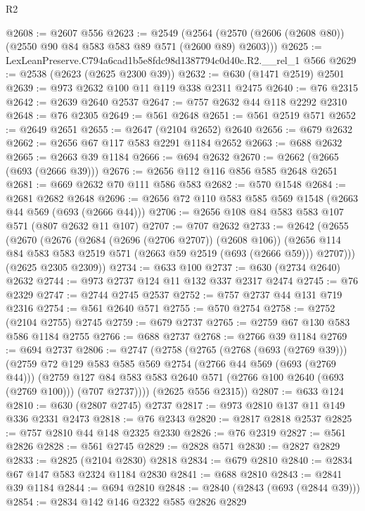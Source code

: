 \begin{lexlean}{R2}
\begin{coremodule}
@2608 := @2607 @556
@2623 := @2549
    (@2564 (@2570 (@2606 (@2608 @80)) (@2550 @90 @84 @583 @583 @89 @571 (@2600 @89) @2603)))
@2625 := LexLeanPreserve.C794a6cad1b5e8fdc98d1387794c0d40c.R2.__rel_1 @566
@2629 := @2538 (@2623 (@2625 @2300 @39))
@2632 := @630 (@1471 @2519) @2501
@2639 := @973 @2632 @100 @11 @119 @338 @2311 @2475
@2640 := @76 @2315
@2642 := @2639 @2640 @2537
@2647 := @757 @2632 @44 @118 @2292 @2310
@2648 := @76 @2305
@2649 := @561 @2648
@2651 := @561 @2519 @571
@2652 := @2649 @2651
@2655 := @2647 (@2104 @2652) @2640
@2656 := @679 @2632
@2662 := @2656 @67 @117 @583 @2291 @1184 @2652
@2663 := @688 @2632
@2665 := @2663 @39 @1184
@2666 := @694 @2632
@2670 := @2662 (@2665 (@693 (@2666 @39)))
@2676 := @2656 @112 @116 @856 @585 @2648 @2651
@2681 := @669 @2632 @70 @111 @586 @583
@2682 := @570 @1548
@2684 := @2681 @2682 @2648
@2696 := @2656 @72 @110 @583 @585 @569 @1548 (@2663 @44 @569 (@693 (@2666 @44)))
@2706 := @2656 @108 @84 @583 @583 @107 @571 (@807 @2632 @11 @107)
@2707 := @707 @2632
@2733 := @2642
    (@2655
      (@2670
        (@2676
          (@2684 (@2696 (@2706 @2707)) (@2608 @106))
          (@2656 @114 @84 @583 @583 @2519 @571 (@2663 @59 @2519 (@693 (@2666 @59))) @2707)))
      (@2625 @2305 @2309))
@2734 := @633 @100
@2737 := @630 (@2734 @2640) @2632
@2744 := @973 @2737 @124 @11 @132 @337 @2317 @2474
@2745 := @76 @2329
@2747 := @2744 @2745 @2537
@2752 := @757 @2737 @44 @131 @719 @2316
@2754 := @561 @2640 @571
@2755 := @570 @2754
@2758 := @2752 (@2104 @2755) @2745
@2759 := @679 @2737
@2765 := @2759 @67 @130 @583 @586 @1184 @2755
@2766 := @688 @2737
@2768 := @2766 @39 @1184
@2769 := @694 @2737
@2806 := @2747
    (@2758
      (@2765
        (@2768 (@693 (@2769 @39)))
        (@2759
          @72
          @129
          @583
          @585
          @569
          @2754
          (@2766 @44 @569 (@693 (@2769 @44)))
          (@2759
            @127
            @84
            @583
            @583
            @2640
            @571
            (@2766 @100 @2640 (@693 (@2769 @100)))
            (@707 @2737))))
      (@2625 @556 @2315))
@2807 := @633 @124
@2810 := @630 (@2807 @2745) @2737
@2817 := @973 @2810 @137 @11 @149 @336 @2331 @2473
@2818 := @76 @2343
@2820 := @2817 @2818 @2537
@2825 := @757 @2810 @44 @148 @2325 @2330
@2826 := @76 @2319
@2827 := @561 @2826
@2828 := @561 @2745
@2829 := @2828 @571
@2830 := @2827 @2829
@2833 := @2825 (@2104 @2830) @2818
@2834 := @679 @2810
@2840 := @2834 @67 @147 @583 @2324 @1184 @2830
@2841 := @688 @2810
@2843 := @2841 @39 @1184
@2844 := @694 @2810
@2848 := @2840 (@2843 (@693 (@2844 @39)))
@2854 := @2834 @142 @146 @2322 @585 @2826 @2829

\end{coremodule}
\end{lexlean}
